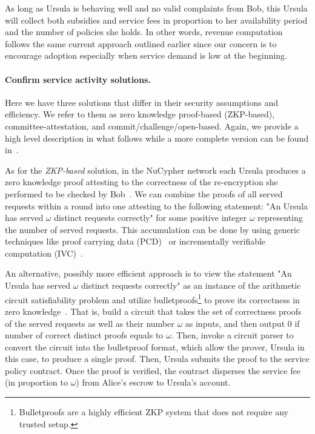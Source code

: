 \documentclass{llncs}
\begin{document}
As long as Ursula is behaving well and no valid complaints from Bob, this Ursula will collect both subsidies and service fees in proportion to her availability period and the number of policies she holds. In other words, revenue computation follows the same current approach outlined earlier since our concern is to encourage adoption especially when service demand is low at the beginning.


\paragraph{Confirm service activity solutions.} Here we have three solutions that differ in their security assumptions and efficiency. We refer to them as zero knowledge proof-based (ZKP-based), committee-attestation, and commit/challenge/open-based. Again, we provide a high level description in what follows while a more complete version can be found in~\cite{confirm-activity-draft}. 


As for the \emph{ZKP-based} solution, in the NuCypher network each Ursula produces a zero knowledge proof attesting to the correctness of the re-encryption she performed to be checked by Bob~\cite{umbral2018}. We can combine the proofs of all served requests within a round into one attesting to the following statement: "An Ursula has served $\omega$ distinct requests correctly" for some positive integer $\omega$ representing the number of served requests. This accumulation can be done by using generic techniques like proof carrying data (PCD)~\cite{chiesa2010proof} or incrementally verifiable computation (IVC)~\cite{valiant08}.


An alternative, possibly more efficient approach is to view the statement "An Ursula has served $\omega$ distinct requests correctly" as an instance of the arithmetic circuit satisfiability problem and utilize bulletproofs\footnote{Bulletproofs are a highly efficient ZKP system that does not require any trusted setup.} to prove its correctness in zero knowledge~\cite{bunz18}. That is, build a circuit that takes the set of correctness proofs of the served requests as well as their number $\omega$ as inputs, and then output 0 if number of correct distinct proofs equals to $\omega$. Then, invoke a circuit parser to convert the circuit into the bulletproof format, which allow the prover, Ursula in this case, to produce a single proof. Then, Ursula submits the proof to the service policy contract. Once the proof is verified, the contract disperses the service fee (in proportion to $\omega$) from Alice's escrow to Ursula's account.
\end{document}
